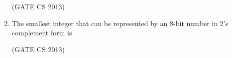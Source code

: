 \documentclass[a4paper, 11pt]{article}
\begin{document}
\begin{enumerate}
\begin{enumerate}
    \end{enumerate}

    \hfill (GATE CS 2013)
    
    \item The smallest integer that can be represented by an 8-bit number in 2’s complement form is 
    \begin{enumerate}
    \end{enumerate}

    \hfill (GATE CS 2013)
    

\end{enumerate}
\end{document}
